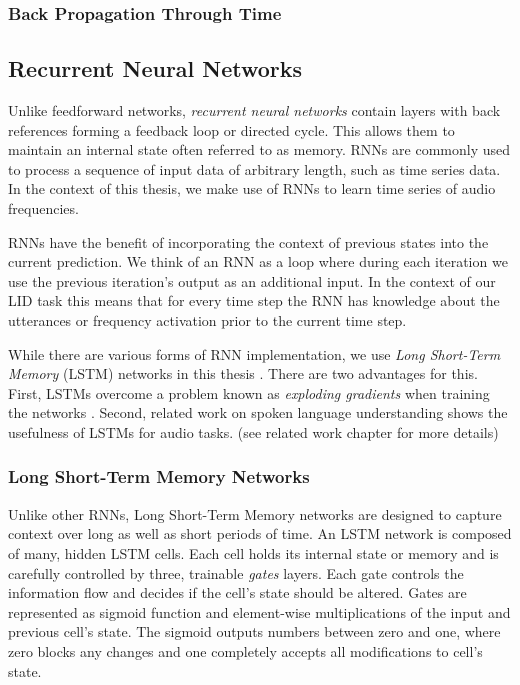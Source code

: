\subsubsection{Back Propagation Through Time}

\subsection{Recurrent Neural Networks}
Unlike feedforward networks, \emph{recurrent neural networks} contain layers with back references forming a feedback loop or directed cycle. This allows them to maintain an internal state often referred to as memory. RNNs are commonly used to process a sequence of input data of arbitrary length, such as time series data. In the context of this thesis, we make use of RNNs to learn time series of audio frequencies.

	RNNs have the benefit of incorporating the context of previous states into the current prediction. We think of an RNN as a loop where during each iteration we use the previous iteration's output as an additional input. In the context of our LID task this means that for every time step the RNN has knowledge about the utterances or frequency activation prior to the current time step.

	While there are various forms of RNN implementation, we use \emph{Long Short-Term Memory} (LSTM) networks in this thesis \cite{hochreiter1997long}. There are two advantages for this. First, LSTMs overcome a problem known as  \emph{exploding gradients} when training the networks \cite[p.~288]{Goodfellow-et-al-2016}. Second, related work on spoken language understanding shows the usefulness of LSTMs for audio tasks. (see related work chapter for more details)

\subsubsection{Long Short-Term Memory Networks}
Unlike other RNNs, Long Short-Term Memory networks are designed to capture context over long as well as short periods of time. An LSTM network is composed of many, hidden LSTM cells. Each cell holds its internal state or memory and is carefully controlled by three, trainable \emph{gates} layers. Each gate controls the information flow and decides if the cell's state should be altered. Gates are represented as sigmoid function and element-wise multiplications of the input and previous cell's state. The sigmoid outputs numbers between zero and one, where zero blocks any changes and one completely accepts all modifications to cell's state.


